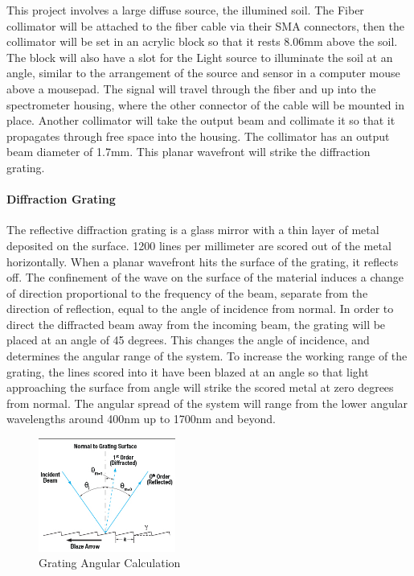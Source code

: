 This project involves a large diffuse source, the illumined soil. The Fiber collimator will be attached to the fiber cable via their SMA connectors, then the collimator will be set in an acrylic block so that it rests 8.06mm above the soil. The block will also have a slot for the Light source to illuminate the soil at an angle, similar to the arrangement of the source and sensor in a computer mouse above a mousepad.
The signal will travel through the fiber and up into the spectrometer housing, where the other connector of the cable will be mounted in place. Another collimator will take the output beam and collimate it so that it propagates through free space into the housing. The collimator has an output beam diameter of 1.7mm. This planar wavefront will strike the diffraction grating.

\paragraph{Diffraction Grating} The reflective diffraction grating is a glass mirror with a thin layer of metal deposited on the surface. 1200 lines per millimeter are scored out of the metal horizontally. When a planar wavefront hits the surface of the grating, it reflects off. The confinement of the wave on the surface of the material induces a change of direction proportional to the frequency of the beam, separate from the direction of reflection, equal to the angle of incidence from normal. In order to direct the diffracted beam away from the incoming beam, the grating will be placed at an angle of 45 degrees. This changes the angle of incidence, and determines the angular range of the system. To increase the working range of the grating, the lines scored into it have been blazed at an angle so that light approaching the surface from angle will strike the scored metal at zero degrees from normal. The angular spread of the system will range from the lower angular wavelengths around 400nm up to 1700nm and beyond. 
\begin{figure}[H]
    \caption{Grating Angular Calculation}
    \centering
    \includegraphics[width=0.4\textwidth]{images/ThorlabsGratingTutorial.png}
\end{figure}


